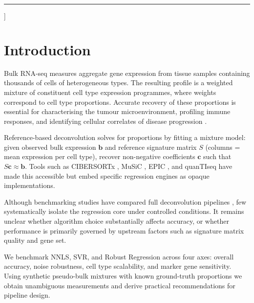 \documentclass[10pt,twocolumn]{article}
\begin{document}
{\begin{@twocolumnfalse}
\begin{abstract}
\medskip\noindent\textbf{Availability and Implementation:}
All code is implemented in Python 3.10 using scipy, scikit-learn, and
statsmodels and is available at
\href{https://github.com/VighneshDev1411/deconv-benchmark}{\textcolor{blue}{github.com/VighneshDev1411/deconv-benchmark}}.

\medskip\noindent\textbf{Contact:}
\href{mailto:vpath6@uic.edu}{vpath6@uic.edu}
\end{abstract}

\vspace{6pt}\hrule\vspace{12pt}
\end{@twocolumnfalse}
}]

\section{Introduction}

Bulk RNA-seq measures aggregate gene expression from tissue samples
containing thousands of cells of heterogeneous types. The resulting profile
is a weighted mixture of constituent cell type expression programmes, where
weights correspond to cell type proportions. Accurate recovery of these
proportions is essential for characterising the tumour microenvironment,
profiling immune responses, and identifying cellular correlates of disease
progression \citep{wang2019}.

Reference-based deconvolution solves for proportions by fitting a mixture
model: given observed bulk expression $\mathbf{b}$ and reference signature
matrix $S$ (columns = mean expression per cell type), recover non-negative
coefficients $\mathbf{c}$ such that $S\mathbf{c}\approx\mathbf{b}$. Tools
such as CIBERSORTx \citep{newman2019}, MuSiC \citep{wang2019}, EPIC
\citep{racle2017}, and quanTIseq \citep{finotello2019} have made this
accessible but embed specific regression engines as opaque implementations.

Although benchmarking studies have compared full deconvolution
pipelines \citep{sturm2019,avilacobo2020}, few systematically isolate the
regression core under controlled conditions. It remains unclear whether
algorithm choice substantially affects accuracy, or whether performance is
primarily governed by upstream factors such as signature matrix quality and
gene set.

We benchmark NNLS, SVR, and Robust Regression across four axes: overall
accuracy, noise robustness, cell type scalability, and marker gene
sensitivity. Using synthetic pseudo-bulk mixtures with known ground-truth
proportions we obtain unambiguous measurements and derive practical
recommendations for pipeline design.
\end{document}
